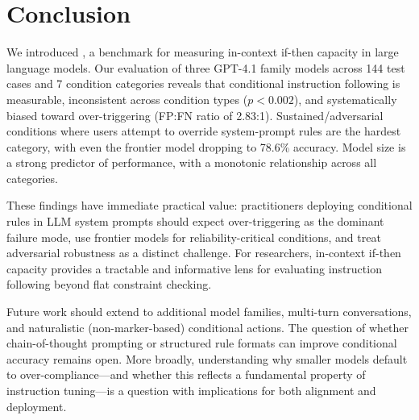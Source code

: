 \section{Conclusion}
\label{sec:conclusion}

We introduced \benchname, a benchmark for measuring in-context if-then capacity in large language models. Our evaluation of three GPT-4.1 family models across 144 test cases and 7 condition categories reveals that conditional instruction following is measurable, inconsistent across condition types ($p < 0.002$), and systematically biased toward over-triggering (FP:FN ratio of 2.83:1). Sustained/adversarial conditions where users attempt to override system-prompt rules are the hardest category, with even the frontier model dropping to 78.6\% accuracy. Model size is a strong predictor of performance, with a monotonic relationship across all categories.

These findings have immediate practical value: practitioners deploying conditional rules in LLM system prompts should expect over-triggering as the dominant failure mode, use frontier models for reliability-critical conditions, and treat adversarial robustness as a distinct challenge. For researchers, in-context if-then capacity provides a tractable and informative lens for evaluating instruction following beyond flat constraint checking.

Future work should extend \benchname to additional model families, multi-turn conversations, and naturalistic (non-marker-based) conditional actions. The question of whether chain-of-thought prompting or structured rule formats can improve conditional accuracy remains open. More broadly, understanding why smaller models default to over-compliance---and whether this reflects a fundamental property of instruction tuning---is a question with implications for both alignment and deployment.
